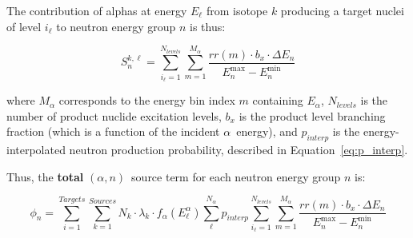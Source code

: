 \documentclass[10pt]{article}
\newcommand{\alphn}[0]{$\left(\alpha,n\right)$}
\begin{document}
The contribution of alphas at energy $E_\ell$ from isotope $k$ producing a target nuclei of level $i_\ell$ to neutron energy group $n$ is thus:

\begin{equation}
S_n^{k,\ell} =  \sum_{i_\ell=1}^{N_{levels}} \sum_{m=1}^{M_\alpha}  \frac{rr\left(m\right)\cdot b_x \cdot \Delta E_n }{E_n^{\max} - E_n^{\min}}
\end{equation}

where $M_\alpha$ corresponds to the energy bin index $m$ containing $E_\alpha$, $N_{levels}$ is the number of product nuclide excitation levels, $b_x$ is the product level branching fraction (which is a function of the incident $\alpha$\ energy), and $p_{interp}$ is the energy-interpolated neutron production probability, described in Equation~\eqref{eq:p_interp}.

Thus, the \textbf{total} \alphn\ source term for each neutron energy group $n$ is:

\begin{equation}
\displaystyle \boxed{ \phi_n = \sum_{i=1}^{Targets} \sum_{k=1}^{Sources} N_k \cdot \lambda_k \cdot f_\alpha \left( E^\alpha_\ell  \right) \sum_{\ell}^{N_{\alpha}}  p_{interp} \sum_{i_\ell=1}^{N_{levels}} \sum_{m=1}^{M_\alpha}  \frac{rr\left(m\right)\cdot b_x \cdot \Delta E_n }{E_n^{\max} - E_n^{\min}}}
\end{equation}
\end{document}
